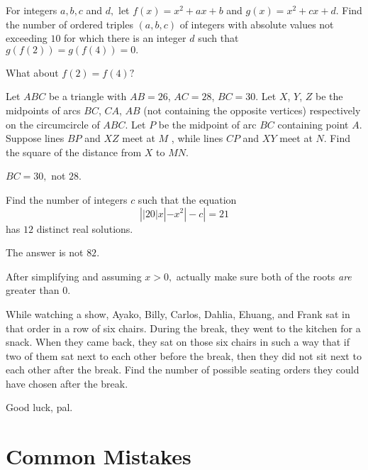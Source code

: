 \documentclass[mast]{lucky}
\begin{document}
\begin{prob}[AIME I 2020/11]{9}
For integers $a,b,c$ and $d,$ let $f(x)=x^2+ax+b$ and $g(x)=x^2+cx+d.$ Find the number of ordered triples $(a,b,c)$ of integers with absolute values not exceeding $10$ for which there is an integer $d$ such that $g(f(2))=g(f(4))=0.$
\begin{mistakes}
    \begin{mistake}
        What about $f(2)=f(4)?$
    \end{mistake}
\end{mistakes}
\end{prob}

\begin{prob}{9}
Let $ABC$ be a triangle with $AB=26$, $AC=28$, $BC=30$. Let $X$, $Y$, $Z$ be the midpoints of arcs $BC$, $CA$, $AB$ (not containing the opposite vertices) respectively on the circumcircle of $ABC$. Let $P$ be the midpoint of arc $BC$ containing point $A$. Suppose lines $BP$ and $XZ$ meet at $M$ , while lines $CP$ and $XY$ meet at $N$. Find the square of the distance from $X$ to $MN$.
\begin{mistakes}
    \begin{mistake}
        $BC=30,$ not $28.$
    \end{mistake}
\end{mistakes}
\end{prob}

\begin{prob}[AIME I 2021/8]{13}
Find the number of integers $c$ such that the equation $$\left||20|x|-x^2|-c\right|=21$$has $12$ distinct real solutions.
\begin{mistakes}
    \begin{mistake}
        The answer is not $82.$
    \end{mistake}
    \begin{mistake}
        After simplifying and assuming $x>0,$ actually make sure both of the roots \textit{are} greater than $0.$
    \end{mistake}
\end{mistakes}
\end{prob}

\begin{prob}[AIME II 2020/9]{13}
While watching a show, Ayako, Billy, Carlos, Dahlia, Ehuang, and Frank sat in that order in a row of six chairs. During the break, they went to the kitchen for a snack. When they came back, they sat on those six chairs in such a way that if two of them sat next to each other before the break, then they did not sit next to each other after the break. Find the number of possible seating orders they could have chosen after the break.
\begin{mistakes}
    \begin{mistake}
        Good luck, pal.
    \end{mistake}
\end{mistakes}
\end{prob}



\pagebreak

\section{Common Mistakes}

\printmistake
\end{document}
